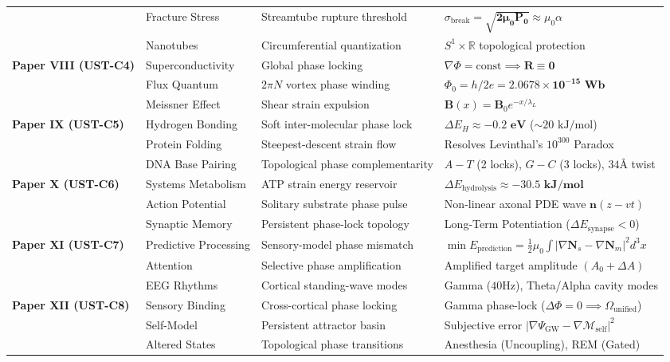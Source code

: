 \documentclass[11pt,a4paper]{article}
\begin{document}
\begin{table}[htbp]
{\begin{tabular}{llll}
				& Fracture Stress & Streamtube rupture threshold & $\sigma_{\text{break}} = \mathbf{\sqrt{2\mu_0 P_0}} \approx \mu_0 \alpha$ \\
				& Nanotubes & Circumferential quantization & $S^1 \times \mathbb{R}$ topological protection \\
				\midrule
				\textbf{Paper VIII (UST-C4)} & Superconductivity & Global phase locking & $\nabla \Phi = \text{const} \implies \mathbf{R \equiv 0}$ \\
				& Flux Quantum & $2\pi N$ vortex phase winding & $\Phi_0 = h/2e = \mathbf{2.0678 \times 10^{-15} \text{ Wb}}$ \\
				& Meissner Effect & Shear strain expulsion & $\mathbf{B}(x) = \mathbf{B}_0 e^{-x/\lambda_L}$ \\
				\midrule
				\textbf{Paper IX (UST-C5)} & Hydrogen Bonding & Soft inter-molecular phase lock & $\Delta E_H \approx \mathbf{-0.2 \text{ eV}}$ ($\sim 20 \text{ kJ/mol}$) \\
				& Protein Folding & Steepest-descent strain flow & Resolves Levinthal's $10^{300}$ Paradox \\
				& DNA Base Pairing & Topological phase complementarity & $A-T$ (2 locks), $G-C$ (3 locks), $34\text{\AA}$ twist \\
				\midrule
				\textbf{Paper X (UST-C6)} & Systems Metabolism & ATP strain energy reservoir & $\Delta E_{\text{hydrolysis}} \approx \mathbf{-30.5 \text{ kJ/mol}}$ \\
				& Action Potential & Solitary substrate phase pulse & Non-linear axonal PDE wave $\mathbf{n}(z-v t)$ \\
				& Synaptic Memory & Persistent phase-lock topology & Long-Term Potentiation ($\Delta E_{\text{synapse}} < 0$) \\
				\midrule
				\textbf{Paper XI (UST-C7)} & Predictive Processing & Sensory-model phase mismatch & $\min E_{\text{prediction}} = \frac{1}{2}\mu_0 \int |\nabla\mathbf{N}_s - \nabla\mathbf{N}_m|^2 d^3x$ \\
				& Attention & Selective phase amplification & Amplified target amplitude $(A_0 + \Delta A)$ \\
				& EEG Rhythms & Cortical standing-wave modes & Gamma ($40\text{Hz}$), Theta/Alpha cavity modes \\
				\midrule
				\textbf{Paper XII (UST-C8)} & Sensory Binding & Cross-cortical phase locking & Gamma phase-lock ($\Delta\Phi=0 \implies \Omega_{\text{unified}}$) \\
				& Self-Model & Persistent attractor basin & Subjective error $| \nabla\Psi_{\text{GW}} - \nabla\mathcal{M}_{\text{self}} |^2$ \\
				& Altered States & Topological phase transitions & Anesthesia (Uncoupling), REM (Gated) \\
				\bottomrule
		\end{tabular}}
	\end{table}
	\FloatBarrier
	
\end{document}
